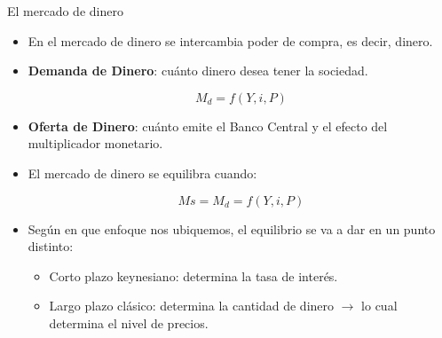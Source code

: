 \documentclass{beamer}
\begin{document}
\begin{frame}{El mercado de dinero}
\begin{itemize}
    \item En el mercado de dinero se intercambia  poder de compra, es decir, dinero.
    \item \textbf{Demanda de Dinero}: cuánto dinero desea tener la sociedad. 
            \begin{center}
            \begin{tcolorbox}[width=2in, boxsep=0pt, left=0pt, right=0pt, top=2pt,colframe = blue!70!black, colback = blue!7!white]%
                    $$ M_{d}=f(Y, i, P) $$
             \end{tcolorbox}
             \end{center} 
     \item \textbf{Oferta de Dinero}: cuánto emite el Banco Central y el efecto del multiplicador monetario.
     \item El mercado de dinero se equilibra cuando:
     \begin{center}
            \begin{tcolorbox}[width=2.5in, boxsep=0pt, left=0pt, right=0pt, top=2pt,colframe = blue!70!black, colback = blue!7!white]%
                    $$Ms= M_{d}=f(Y, i, P) $$
             \end{tcolorbox}
    \end{center} 
    \item Según en que enfoque nos ubiquemos, el equilibrio se va a dar en un punto distinto:
    \begin{itemize}
        \item Corto plazo keynesiano: determina la tasa de interés.
        \item Largo plazo clásico: determina la cantidad de dinero $\rightarrow$ lo cual determina el nivel de precios.
    \end{itemize}
\end{itemize}
\end{frame}
\end{document}
